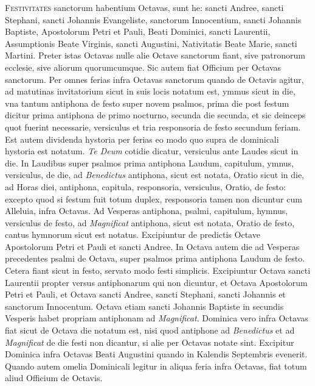\begin{multicols*}{2}
{\color{Red} }
\lettrine[lines=2]{\zallmancaps \color{Blue} F}{estivitates} sanctorum habentium Octavas, sunt he: sancti Andree, sancti Stephani, sancti Johannis Evangeliste, sanctorum Innocentium, sancti Johannis Baptiste, Apostolorum Petri et Pauli, Beati Dominici, sancti Laurentii, Assumptionis Beate Virginis, sancti Augustini, Nativitatis Beate Marie, sancti Martini.
Preter istas Octavas nulle alie Octave sanctorum fiant, sive patronorum ecclesie, sive aliorum quorumcumque. Sic autem fiat Officium per Octavas sanctorum.
Per omnes ferias infra Octavas sanctorum quando de Octavis agitur, ad matutinas invitatorium sicut in suis locis notatum est, ymmus sicut in die, vna tantum antiphona de festo super novem psalmos, prima die post festum dicitur prima antiphona de primo nocturno, secunda die secunda, et sic deinceps quot fuerint necessarie, versiculus et tria responsoria de festo secundum feriam. Est autem dividenda hystoria per ferias eo modo quo supra de dominicali hystoria est notatum. \textit{Te Deum} cotidie dicatur, versiculus ante Laudes sicut in die.
In Laudibus super psalmos prima antiphona Laudum, capitulum, ymnus, versiculus, de die, ad \textit{Benedictus} antiphona, sicut est notata, Oratio sicut in die, ad Horas diei, antiphona, capitula, responsoria, versiculus, Oratio, de festo: excepto quod si festum fuit totum duplex, responsoria tamen non dicuntur cum Alleluia, infra Octavas. Ad Vesperas antiphona, psalmi, capitulum, hymnus, versiculus de festo, ad \textit{Magnificat} antiphona, sicut est notata, Oratio de festo, cantus hymnorum sicut est notatus. Excipiuntur de predictis Octave Apostolorum Petri et Pauli et sancti Andree. In Octava autem die ad Vesperas precedentes psalmi de Octava, super psalmos prima antiphona Laudum de festo. Cetera fiant sicut in festo, servato modo festi simplicis. Excipiuntur Octava sancti Laurentii propter versus antiphonarum qui non dicuntur, et Octava Apostolorum Petri et Pauli, et Octava sancti Andree, sancti Stephani, sancti Johannis et sanctorum Innocentum.
Octava etiam sancti Johannis Baptiste in secundis Vesperis habet propriam antiphonam ad \textit{Magnificat}. Dominica vero infra Octavas fiat sicut de Octava die notatum est, nisi quod antiphone ad \textit{Benedictus} et ad \textit{Magnificat} de die festi non dicantur, si alie per Octavas notate sint. Excipitur Dominica infra Octavas Beati Augustini quando in Kalendis Septembris evenerit.
Quando autem omelia Dominicali legitur in aliqua feria infra Octavas, fiat totum aliud Officium de Octavis.


\end{multicols*}
